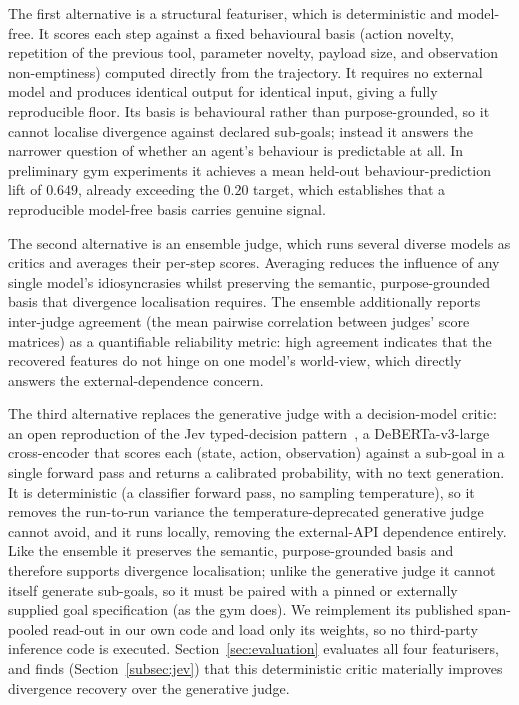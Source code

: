 The first alternative is a structural featuriser, which is deterministic and
model-free. It scores each step against a fixed behavioural basis (action novelty,
repetition of the previous tool, parameter novelty, payload size, and observation
non-emptiness) computed directly from the trajectory. It requires no external model
and produces identical output for identical input, giving a fully reproducible
floor. Its basis is behavioural rather than purpose-grounded, so it cannot localise
divergence against declared sub-goals; instead it answers the narrower question of
whether an agent's behaviour is predictable at all. In preliminary gym experiments
it achieves a mean held-out behaviour-prediction lift of $0.649$, already exceeding
the $0.20$ target, which establishes that a reproducible model-free basis carries
genuine signal.

The second alternative is an ensemble judge, which runs several diverse models as
critics and averages their per-step scores. Averaging reduces the influence of any
single model's idiosyncrasies whilst preserving the semantic, purpose-grounded
basis that divergence localisation requires. The ensemble additionally reports
inter-judge agreement (the mean pairwise correlation between judges' score
matrices) as a quantifiable reliability metric: high agreement indicates that the
recovered features do not hinge on one model's world-view, which directly answers
the external-dependence concern.

The third alternative replaces the generative judge with a decision-model critic:
an open reproduction of the Jev typed-decision pattern~\citep{typesafeJev2026,
openJevDeberta2026}, a DeBERTa-v3-large cross-encoder that scores each (state,
action, observation) against a sub-goal in a single forward pass and returns a
calibrated probability, with no text generation. It is deterministic (a classifier
forward pass, no sampling temperature), so it removes the run-to-run variance the
temperature-deprecated generative judge cannot avoid, and it runs locally, removing
the external-API dependence entirely. Like the ensemble it preserves the semantic,
purpose-grounded basis and therefore supports divergence localisation; unlike the
generative judge it cannot itself generate sub-goals, so it must be paired with a
pinned or externally supplied goal specification (as the gym does). We reimplement
its published span-pooled read-out in our own code and load only its weights, so no
third-party inference code is executed. Section~\ref{sec:evaluation} evaluates all
four featurisers, and finds (Section~\ref{subsec:jev}) that this deterministic
critic materially improves divergence recovery over the generative judge.

